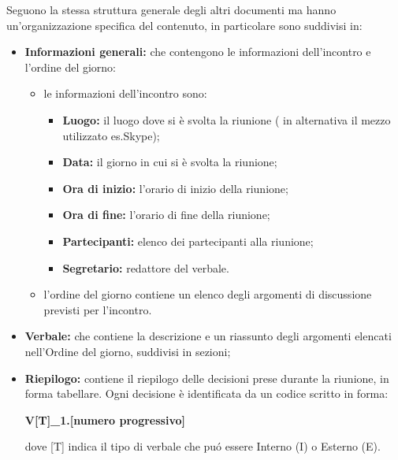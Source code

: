         Seguono la stessa struttura generale degli altri documenti ma hanno un'organizzazione specifica del contenuto, in particolare sono suddivisi in:
        \begin{itemize}
          \item \textbf{Informazioni generali:} che contengono le informazioni dell'incontro e l'ordine del giorno:
            \begin{itemize}
              \item le informazioni dell'incontro sono:
               \begin{itemize}
                 \item \textbf{Luogo:} il luogo dove si è svolta la riunione ( in alternativa il mezzo utilizzato es.Skype);
                 \item \textbf{Data:} il giorno in cui si è svolta la riunione;
                 \item \textbf{Ora di inizio:} l'orario di inizio della riunione;
                 \item \textbf{Ora di fine:} l'orario di fine della riunione;
                 \item \textbf{Partecipanti:} elenco dei partecipanti alla riunione;
                 \item \textbf{Segretario:} redattore del verbale.
               \end{itemize}
              \item l'ordine del giorno contiene un elenco degli argomenti di discussione previsti per l'incontro.
            \end{itemize}
          \item \textbf{Verbale:} che contiene la descrizione e un riassunto degli argomenti elencati nell'Ordine del giorno, suddivisi in sezioni;
          \item \textbf{Riepilogo:} contiene il riepilogo delle decisioni prese durante la riunione, in forma tabellare. Ogni decisione è identificata da un codice scritto in forma:
          \begin{center}
            \textbf{V[T]\_1.[numero progressivo]}
          \end{center}
          dove [T] indica il tipo di verbale che puó essere Interno (I) o Esterno (E).
        \end{itemize}

